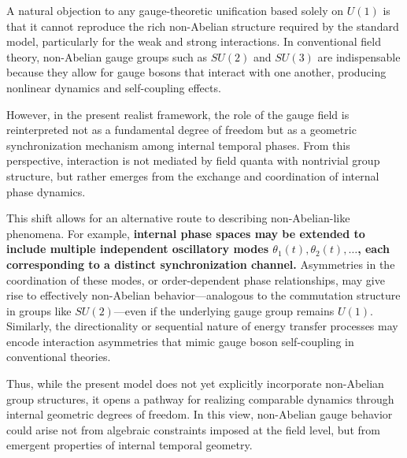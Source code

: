 \documentclass[%
 reprint,
 amsmath,amssymb,
 aps,
]{revtex4-1}
\numberwithin{equation}{section}%
\begin{document}
A natural objection to any gauge-theoretic unification based solely on $U(1)$ is that it cannot reproduce the rich non-Abelian structure required by the standard model, particularly for the weak and strong interactions. In conventional field theory, non-Abelian gauge groups such as $SU(2)$ and $SU(3)$ are indispensable because they allow for gauge bosons that interact with one another, producing nonlinear dynamics and self-coupling effects.

However, in the present realist framework, the role of the gauge field is reinterpreted not as a fundamental degree of freedom but as a geometric synchronization mechanism among internal temporal phases. From this perspective, interaction is not mediated by field quanta with nontrivial group structure, but rather emerges from the exchange and coordination of internal phase dynamics.

This shift allows for an alternative route to describing non-Abelian-like phenomena. For example, \textbf{internal phase spaces may be extended to include multiple independent oscillatory modes $\theta_1(t), \theta_2(t), \dots$, each corresponding to a distinct synchronization channel.} Asymmetries in the coordination of these modes, or order-dependent phase relationships, may give rise to effectively non-Abelian behavior—analogous to the commutation structure in groups like $SU(2)$—even if the underlying gauge group remains $U(1)$. Similarly, the directionality or sequential nature of energy transfer processes may encode interaction asymmetries that mimic gauge boson self-coupling in conventional theories.

Thus, while the present model does not yet explicitly incorporate non-Abelian group structures, it opens a pathway for realizing comparable dynamics through internal geometric degrees of freedom. In this view, non-Abelian gauge behavior could arise not from algebraic constraints imposed at the field level, but from emergent properties of internal temporal geometry.
\end{document}
